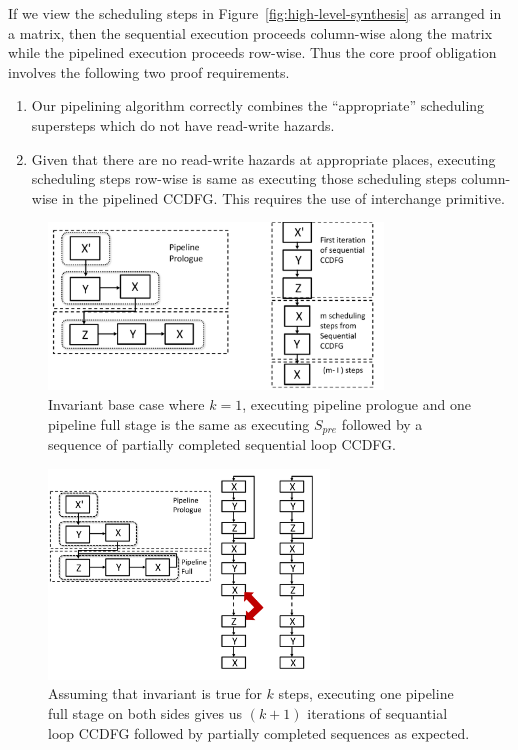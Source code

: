 If we view the scheduling steps in
Figure~\ref{fig:high-level-synthesis} as arranged in a
matrix, then the sequential execution proceeds column-wise
along the matrix while the pipelined execution proceeds
row-wise.  Thus the core proof obligation involves the
following two proof requirements.

\begin{enumerate}[--]
\item Our pipelining algorithm correctly combines the
  ``appropriate'' scheduling supersteps which do not have
  read-write hazards.
\item Given that there are no read-write hazards at
  appropriate places, executing scheduling steps row-wise is
  same as executing those scheduling steps column-wise in
  the pipelined CCDFG.  This requires the use of interchange primitive.
\end{enumerate}

\begin{figure}[t!]
\begin{center}
\includegraphics[width=3.5in]{fig-proposal/invariant-base-case}
\end{center}
\caption{Invariant base case where $k = 1$, executing
  pipeline prologue and one pipeline full stage is the same
  as executing $S_{pre}$ followed by a sequence of partially
  completed sequential loop CCDFG.}
\label{fig:invariant-base-case}
\end{figure}

\begin{figure}[t!]
\begin{center}
\includegraphics[height=2.2in]{fig-proposal/invariant-inductive-step}
\end{center}
\caption{Assuming that
  invariant is true for $k$ steps, executing one pipeline full
  stage on both sides gives us $(k + 1)$ iterations of
  sequantial loop CCDFG followed by partially completed
  sequences as expected.}
\label{fig:invariant-inductive-step}
\end{figure}

